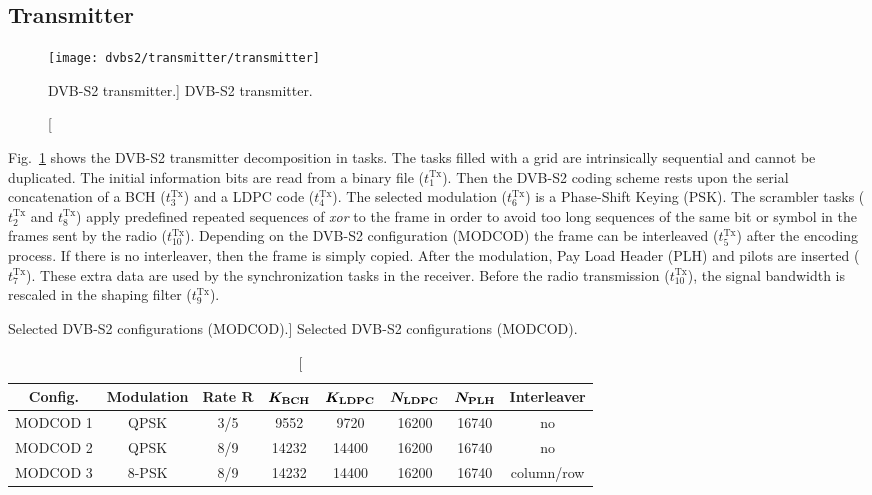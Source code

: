 \subsection{Transmitter}

\begin{figure}[htp]
  \centering
  \texttt{[image: dvbs2/transmitter/transmitter]}
  \caption
    [DVB-S2 transmitter.]
    {DVB-S2 transmitter.}
  \label{fig:dvbs2_transmitter}
\end{figure}

Fig.~\ref{fig:dvbs2_transmitter} shows the DVB-S2 transmitter decomposition in
tasks. The tasks filled with a grid are intrinsically sequential and cannot be
duplicated. The initial information bits are read from a binary file
($t^\text{Tx}_1$). Then the DVB-S2 coding scheme rests upon the serial
concatenation of a BCH ($t^\text{Tx}_3$) and a LDPC code ($t^\text{Tx}_4$). The
selected modulation ($t^\text{Tx}_6$) is a Phase-Shift Keying (PSK). The
scrambler tasks ($t^\text{Tx}_2$ and $t^\text{Tx}_8$) apply predefined repeated
sequences of \emph{xor} to the frame in order to avoid too long sequences of the
same bit or symbol in the frames sent by the radio ($t^\text{Tx}_{10}$).
Depending on the DVB-S2 configuration (MODCOD) the frame can be interleaved
($t^\text{Tx}_5$) after the encoding process. If there is no interleaver, then
the frame is simply copied. After the modulation, Pay Load Header (PLH) and
pilots are inserted ($t^\text{Tx}_7$). These extra data are used by the
synchronization tasks in the receiver. Before the radio transmission
($t^\text{Tx}_{10}$), the signal bandwidth is rescaled in the shaping filter
($t^\text{Tx}_9$).

\begin{table}[htp]
  \centering
  \caption
    [Selected DVB-S2 configurations (MODCOD).]
    {Selected DVB-S2 configurations (MODCOD).}
  \label{tab:dvbs2_modcod}
  \begin{tabular}{c c c c c c c c}
    \textbf{Config.} & \textbf{Modulation} & \textbf{Rate} $\bm{R}$ & $\bm{K_\text{\textbf{BCH}}}$ & $\bm{K_\text{\textbf{LDPC}}}$ & $\bm{N_\text{\textbf{LDPC}}}$ & $\bm{N_\text{\textbf{PLH}}}$ & \textbf{Interleaver}\\
    \hline \hline
    MODCOD 1 &  QPSK & 3/5 &  9552 &  9720 & 16200 & 16740 & no\\
    MODCOD 2 &  QPSK & 8/9 & 14232 & 14400 & 16200 & 16740 & no\\
    MODCOD 3 & 8-PSK & 8/9 & 14232 & 14400 & 16200 & 16740 & column/row\\
  \end{tabular}
\end{table}

